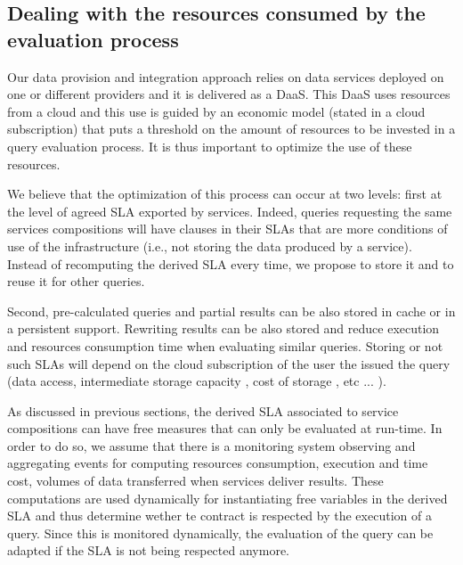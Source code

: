 

\subsection{Dealing with the resources consumed by the evaluation process}
\label{sec:queryProcessOpt}
 
 Our data provision and integration approach relies on data services deployed on one or different providers and it is delivered as a DaaS. This DaaS  uses resources from a cloud and this use  is  guided by an economic model (stated in a cloud subscription) that puts a threshold on the amount of resources to be invested in a query evaluation process. It is thus important to optimize the use of these resources.
 
 We believe that the optimization of this process can occur at two levels: first at the level of agreed SLA exported by services.  Indeed, queries requesting the same services compositions will have clauses in their SLAs that are more conditions of use of the infrastructure (i.e., not storing the data produced by a service). Instead of recomputing the derived SLA every time, we propose to store it and to reuse it for other queries. 
 
Second, pre-calculated queries and partial results can be also stored in cache or in a persistent support. Rewriting results can be also stored and reduce execution and resources consumption time when evaluating similar queries. Storing or not such SLAs will depend on the cloud subscription of the user the issued the query (data access, intermediate storage capacity , cost of storage , etc ... ).

As discussed in previous sections, the derived SLA associated to service compositions can have free measures that can only be evaluated at run-time. In order to do so, we assume that there is a monitoring system observing and aggregating events for computing resources consumption, execution and time cost, volumes of data transferred when services deliver results. These computations are used dynamically for instantiating free variables in the derived SLA and thus determine wether te contract is respected by the execution of a query. Since this is monitored dynamically, the evaluation of the query can be adapted if the SLA is not being respected anymore.




